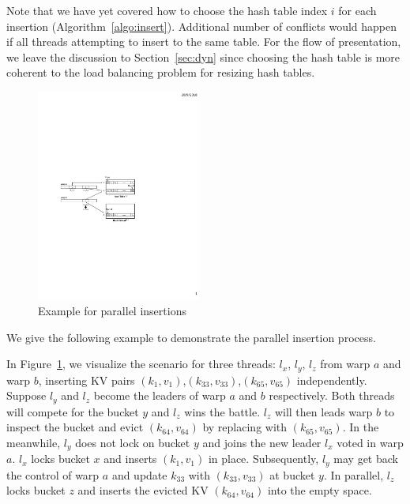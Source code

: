 Note that we have yet covered how to choose the hash table index $i$ for each insertion (Algorithm~\ref{algo:insert}). Additional number of conflicts would happen if all threads attempting to insert to the same table. For the flow of presentation, we leave the discussion to Section~\ref{sec:dyn} since choosing the hash table is more coherent to the load balancing problem for resizing hash tables. 

\begin{figure}[t]
	\centering
	\includegraphics[width=0.48\textwidth]{fig/Voter.pdf}
	\caption{Example for parallel insertions}
	\label{fig:voter}
\end{figure}

We give the following example to demonstrate the parallel insertion process.
\begin{example}
	In Figure~\ref{fig:voter}, we visualize the scenario for three threads: $l_x$, $l_y$, $l_z$ from warp $a$ and warp $b$, inserting KV pairs $(k_1,v_1)$,$(k_{33},v_{33})$,$(k_{65},v_{65})$ independently. 
	Suppose $l_y$ and $l_z$ become the leaders of warp $a$ and $b$ respectively. Both threads will compete for the bucket $y$ and $l_z$ wins the battle. 
	$l_z$ will then leads warp $b$ to inspect the bucket and evict $(k_{64},v_{64})$ by replacing with $(k_{65},v_{65})$. 
	In the meanwhile, $l_y$ does not lock on bucket $y$ and joins the new leader $l_x$ voted in warp $a$. 
	$l_x$ locks bucket $x$ and inserts $(k_1,v_1)$ in place. Subsequently, $l_y$ may get back the control of warp $a$ and update $k_{33}$ with $(k_{33},v_{33})$ at bucket $y$. In parallel, $l_z$ locks bucket $z$ and inserts the evicted KV $(k_{64},v_{64})$ into the empty space. 
\end{example}

